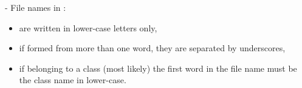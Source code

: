 {\begin{minipage}[c] {0.97\textwidth}
      - File names in {\psiboil}:
      \begin{itemize}
        \item are written in lower-case letters only,   
        \item if formed from more than one word, they are separated by
              underscores,
        \item if belonging to a class (most likely) the first word in the
              file name must be the class name in lower-case.
      \end{itemize}
  \end{minipage} } %
